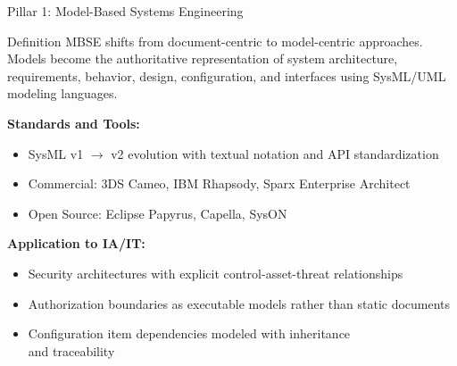 \documentclass{beamer}
\begin{document}
\begin{frame}[allowframebreaks]{Pillar 1: Model-Based Systems Engineering}
  \begin{small}
    \begin{block}{Definition}
      MBSE shifts from document-centric to model-centric approaches. Models become the authoritative representation of system architecture, requirements, behavior, design, configuration, and interfaces using SysML/UML modeling languages.
    \end{block}
    \vspace{1.0cm}
    \textbf{Standards and Tools:}
    \begin{itemize}
      \item SysML v1 \(\rightarrow\) v2 evolution with textual notation and API standardization
      \item Commercial: 3DS Cameo, IBM Rhapsody, Sparx Enterprise Architect
      \item Open Source: Eclipse Papyrus, Capella, SysON
    \end{itemize}
    \vspace{1.5cm}
    \textbf{Application to IA/IT:}
    \begin{itemize}
      \item Security architectures with explicit control-asset-threat relationships
      \item Authorization boundaries as executable models rather than static documents
      \item Configuration item dependencies modeled with inheritance \\ and traceability
    \end{itemize}
  \end{small}
\end{frame}
\end{document}
